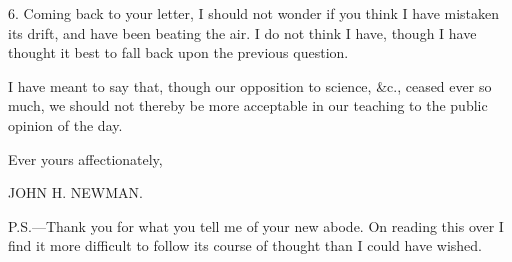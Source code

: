 6. Coming back to your letter, I should not
wonder if you think I have mistaken its drift, and have been beating
the air. I do not think I have, though I have thought it best to fall
back upon the previous question.

I have meant to say that, though our opposition
to science, \&c., ceased ever so much, we should not thereby be
more acceptable in our teaching to the public opinion of the day.

Ever yours affectionately,

JOHN H. NEWMAN.

P.S.—Thank you for what you tell me of your new
abode. On reading this over I find it more difficult to follow its
course of thought than I could have wished.
